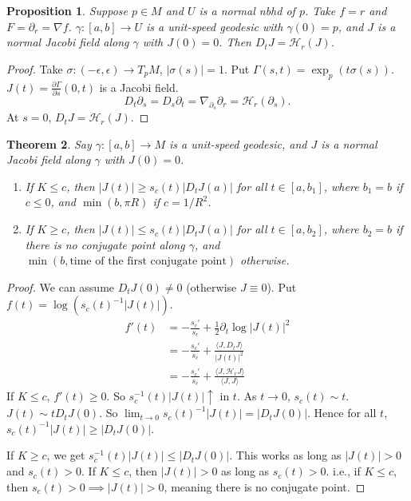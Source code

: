 \documentclass[11pt, a4paper]{article}
\theoremstyle{plain}
\newtheorem{theorem}{Theorem}[section]
\newtheorem{proposition}[theorem]{Proposition}
\theoremstyle{definition}
\theoremstyle{remark}
\begin{document}
{\begin{proposition}
Suppose $p \in M$ and $U$ is a normal nbhd of $p$. Take $f = r$ and $F = \partial_r = \nabla f$. $\gamma: [a,b] \to U$ is a unit-speed geodesic with $\gamma(0) = p$, and $J$ is a normal Jacobi field along $\gamma$ with $J(0) = 0$. Then $D_t J = \mathcal{H}_r(J)$.
\end{proposition}

\begin{proof}
Take $\sigma: (-\epsilon, \epsilon) \to T_p M$, $|\sigma(s)|=1$. Put $\Gamma(s,t) = \exp_p(t \sigma(s))$. 
$J(t) = \frac{\partial \Gamma}{\partial s}(0,t)$ is a Jacobi field.
\[ D_t \partial_s = D_s \partial_t = \nabla_{\partial_s} \partial_r = \mathcal{H}_r(\partial_s). \]
At $s=0$, $D_t J = \mathcal{H}_r(J)$.
\end{proof}

\begin{theorem}
Say $\gamma: [a,b] \to M$ is a unit-speed geodesic, and $J$ is a normal Jacobi field along $\gamma$ with $J(0)=0$.
\begin{enumerate}
    \item If $K \le c$, then $|J(t)| \ge s_c(t) |D_t J(a)|$ for all $t \in [a, b_1]$, where $b_1 = b$ if $c \le 0$, and $\min(b, \pi R)$ if $c = 1/R^2$.
    \item If $K \ge c$, then $|J(t)| \le s_c(t) |D_t J(a)|$ for all $t \in[a, b_2]$, where $b_2 = b$ if there is no conjugate point along $\gamma$, and $\min(b, \text{time of the first conjugate point})$ otherwise.
\end{enumerate}
\end{theorem}

\begin{proof}
We can assume $D_t J(0) \neq 0$ (otherwise $J \equiv 0$).
Put $f(t) = \log (s_c(t)^{-1} |J(t)|)$.
\begin{align*}
    f'(t) &= -\frac{s_c'}{s_c} + \frac{1}{2} \partial_t \log|J(t)|^2 \\
    &= -\frac{s_c'}{s_c} + \frac{\langle J, D_t J \rangle}{|J(t)|^2} \\
    &= -\frac{s_c'}{s_c} + \frac{\langle J, \mathcal{H}_r J \rangle}{\langle J, J \rangle}
\end{align*}
If $K \le c$, $f'(t) \ge 0$. So $s_c^{-1}(t) |J(t)| \uparrow$ in $t$.
As $t \to 0$, $s_c(t) \sim t$. $J(t) \sim t D_t J(0)$.
So $\lim_{t \to 0} s_c(t)^{-1} |J(t)| = |D_t J(0)|$.
Hence for all $t$, $s_c(t)^{-1} |J(t)| \ge |D_t J(0)|$.

If $K \ge c$, we get $s_c^{-1}(t)|J(t)| \le |D_t J(0)|$. This works as long as $|J(t)| > 0$ and $s_c(t) > 0$.
If $K \le c$, then $|J(t)| > 0$ as long as $s_c(t) > 0$. 
i.e., if $K \le c$, then $s_c(t) > 0 \implies |J(t)| > 0$, meaning there is no conjugate point.
\end{proof}


}
\end{document}
